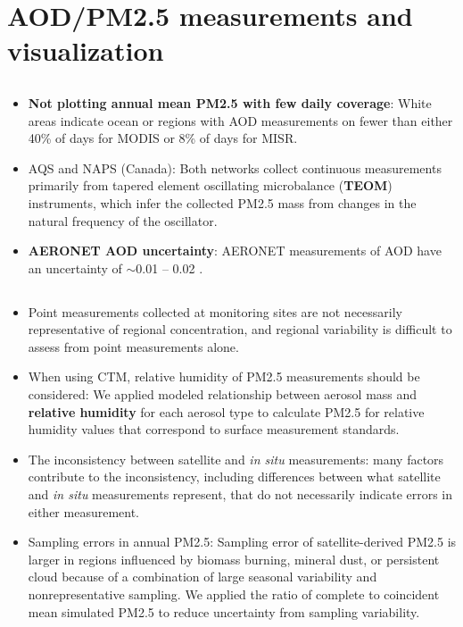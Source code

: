 \documentclass[11pt]{article}
\begin{document}
\setcounter{tocdepth}{1} %
\tableofcontents
\newpage 


\section{AOD/PM2.5 measurements and visualization}

\subsection{\citet{van2006estimating}}
\begin{itemize}
    \item \textbf{Not plotting annual mean PM2.5 with few daily coverage}: White areas indicate ocean or regions with AOD measurements on fewer than either 40\% of days for MODIS or 8\% of days for MISR.
    \item AQS and NAPS (Canada): Both networks collect continuous measurements primarily from tapered element oscillating microbalance (\textbf{TEOM}) instruments, which infer the collected PM2.5 mass from changes in the natural frequency of the oscillator. 
    \item \textbf{AERONET AOD uncertainty}:  AERONET measurements of AOD have an uncertainty of $\sim$0.01 -- 0.02 \citep{holben2001emerging}.
\end{itemize}

\subsection{\citet{van2010global}}
\begin{itemize}
    \item Point measurements collected at monitoring sites are not necessarily representative of regional concentration, and regional variability is difficult to assess from point measurements alone. 
    \item When using CTM, relative humidity of PM2.5 measurements should be considered: We applied modeled relationship between aerosol mass and \textbf{relative humidity} for each aerosol type to calculate PM2.5 for relative humidity values that correspond to surface measurement standards. 
    \item The inconsistency between satellite and \textit{in situ} measurements: many factors contribute to the inconsistency, including differences between what satellite and \textit{in situ} measurements represent, that do not necessarily indicate errors in either measurement.
    \item Sampling errors in annual PM2.5: Sampling error of satellite-derived PM2.5 is larger in regions influenced by biomass burning, mineral dust, or persistent cloud because of a combination of large seasonal variability and nonrepresentative sampling. We applied the ratio of complete to coincident mean simulated PM2.5 to reduce uncertainty from sampling variability.
\end{itemize}
\end{document}
